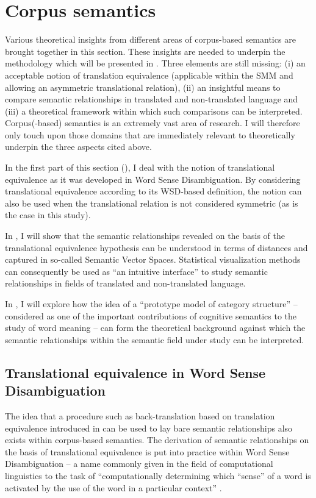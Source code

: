\section{Corpus semantics}
\label{sec:2.4}  
Various theoretical insights from different areas of corpus-based semantics are brought together in this section. These insights are needed to underpin the methodology which will be presented in . Three elements are still missing: (i) an acceptable notion of translation equivalence (applicable within the SMM and allowing an asymmetric translational relation), (ii) an insightful means to compare semantic relationships in translated and non-translated language and (iii) a theoretical framework within which such comparisons can be interpreted. Corpus(-based) semantics is an extremely vast area of research. I will therefore only touch upon those domains that are immediately relevant to theoretically underpin the three aspects cited above.

In the first part of this section (), I deal with the notion of translational equivalence as it was developed in Word Sense Disambiguation. By considering translational equivalence according to its WSD-based definition, the notion can also be used when the translational relation is not considered symmetric (as is the case in this study).

In , I will show that the semantic relationships revealed on the basis of the translational equivalence hypothesis can be understood in terms of distances and captured in so-called Semantic Vector Spaces. Statistical visualization methods can consequently be used as “an intuitive interface” \citep*[17]{heylen_looking_2012} to study semantic relationships in fields of translated and non-translated language.

In , I will explore how the idea of a “prototype model of category structure” – considered as one of the important contributions of cognitive semantics to the study of word meaning \citep[577]{allan_lexical_2013} – can form the theoretical background against which the semantic relationships within the semantic field under study can be interpreted.

\subsection{Translational equivalence in Word Sense Disambiguation}
\label{sec:2.4.1}  
The idea that a procedure such as back-translation based on translation equivalence introduced in  can be used to lay bare semantic relationships also exists within corpus-based semantics. The derivation of semantic relationships on the basis of translational equivalence is put into practice within Word Sense Disambiguation – a name commonly given in the field of computational linguistics to the task of “computationally determining which ``sense'' of a word is activated by the use of the word in a particular context” \citep[1]{agirre_word_2007}.

